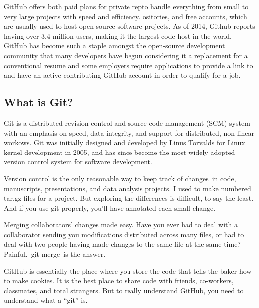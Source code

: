 \noindent GitHub offers both paid plans for private repto handle everything from small to very large projects with speed and efficiency. ositories, and free accounts, which are usually used to host open source software projects. As of 2014, Github reports having over 3.4 million users, making it the largest code host in the world.\\

\noindent GitHub has become such a staple amongst the open-source development community that many developers have begun considering it a replacement for a conventional resume and some employers require applications to provide a link to and have an active contributing GitHub account in order to qualify for a job.

\subsection{What is Git?}
Git is a distributed revision control and source code management (SCM) system with an emphasis on speed, data integrity, and support for distributed, non-linear workows. Git was initially designed and developed by Linus Torvalds for Linux  kernel development in 2005,  and has  since become the most widely adopted version   control   system  for software development.

Version control is the only reasonable way to keep track of changes in code, manuscripts, presentations, and data analysis projects. I used to make numbered tar.gz files for a project. But exploring the differences is difficult, to say the least. And if you use git properly, you’ll have annotated each small change.

Merging collaborators’ changes made easy. Have you ever had to deal with a collaborator sending you modifications distributed across many files, or had to deal with two people having made changes to the same file at the same time? Painful. git merge is the answer.

GitHub is essentially the place where you store the code that tells the baker how to make cookies. It is the best place to share code with friends, co-workers, classmates, and total strangers. But to really understand GitHub, you need to understand what a “git” is.


